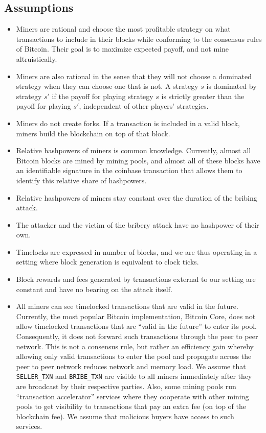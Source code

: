 \documentclass[runningheads]{llncs}
\newcommand{\sellertxn}{\texttt{SELLER\_TXN}}
\newcommand{\bribetxn}{\texttt{BRIBE\_TXN}}
\begin{document}
\subsection{Assumptions}
\begin{itemize}
    \item Miners are rational and choose the most profitable strategy on what transactions to include in their blocks while conforming to the consensus rules of Bitcoin. Their goal is to maximize expected payoff, and not mine altruistically. 
    \item Miners are also rational in the sense that they will not choose a dominated strategy when they can choose one that is not. A strategy $s$ is dominated by strategy $s'$ if the payoff for playing strategy $s$ is strictly greater than the payoff for playing $s'$, independent of other players' strategies.
    \item Miners do not create forks. If a transaction is included in a valid block, miners build the blockchain on top of that block.
    \item Relative hashpowers of miners is common knowledge. Currently, almost all Bitcoin blocks are mined by mining pools, and almost all of these blocks have an identifiable signature in the coinbase transaction that allows them to identify this relative share of hashpowers. 
    \item Relative hashpowers of miners stay constant over the duration of the bribing attack.
    \item The attacker and the victim of the bribery attack have no hashpower of their own. 
    \item Timelocks are expressed in number of blocks, and we are thus operating in a setting where block generation is equivalent to clock ticks.
    \item Block rewards and fees generated by transactions external to our setting are constant and have no bearing on the attack itself. 
    \item All miners can see timelocked transactions that are valid in the future. Currently, the most popular Bitcoin implementation, Bitcoin Core, does not allow timelocked transactions that are ``valid in the future'' to enter its pool. Consequently, it does not forward such transactions through the peer to peer network. This is not a consensus rule, but rather an efficiency gain whereby allowing only valid transactions to enter the pool and propagate across the peer to peer network reduces network and memory load. We assume that \sellertxn{} and \bribetxn{} are visible to all miners immediately after they are broadcast by their respective parties. Also, some mining pools run ``transaction accelerator'' services where they cooperate with other mining pools to get visibility to transactions that pay an extra fee (on top of the blockchain fee). We assume that malicious buyers have access to such services.    
\end{itemize}
\end{document}
